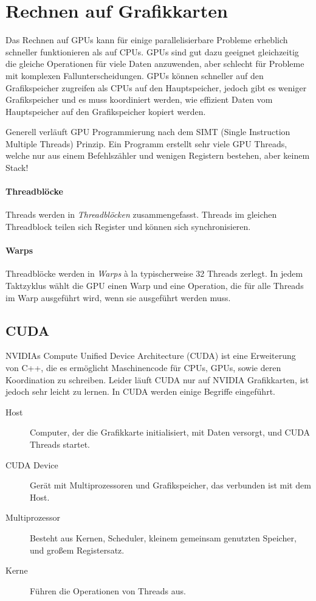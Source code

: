 \section{Rechnen auf Grafikkarten}
Das Rechnen auf GPUs kann für einige parallelisierbare Probleme erheblich schneller funktionieren als auf CPUs.
GPUs sind gut dazu geeignet gleichzeitig die gleiche Operationen für viele Daten anzuwenden, aber schlecht für Probleme mit komplexen Fallunterscheidungen.
GPUs können schneller auf den Grafikspeicher zugreifen als CPUs auf den Hauptspeicher, jedoch gibt es weniger Grafikspeicher und es muss koordiniert werden, wie effizient Daten vom Hauptspeicher auf den Grafikspeicher kopiert werden.

Generell verläuft GPU Programmierung nach dem SIMT (Single Instruction Multiple Threads) Prinzip.
Ein Programm erstellt sehr viele GPU Threads, welche nur aus einem Befehlszähler und wenigen Registern bestehen, aber keinem Stack!

\paragraph{Threadblöcke}
Threads werden in \emph{Threadblöcken} zusammengefasst.
Threads im gleichen Threadblock teilen sich Register und können sich synchronisieren.

\paragraph{Warps}
Threadblöcke werden in \emph{Warps} à la typischerweise 32 Threads zerlegt.
In jedem Taktzyklus wählt die GPU einen Warp und eine Operation, die für alle Threads im Warp ausgeführt wird, wenn sie ausgeführt werden muss.

\subsection{CUDA}
NVIDIAs Compute Unified Device Architecture (CUDA) ist eine Erweiterung von C++, die es ermöglicht Maschinencode für CPUs, GPUs, sowie deren Koordination zu schreiben.
Leider läuft CUDA nur auf NVIDIA Grafikkarten, ist jedoch sehr leicht zu lernen.
In CUDA werden einige Begriffe eingeführt.

\begin{description}
\item[Host] Computer, der die Grafikkarte initialisiert, mit Daten versorgt, und CUDA Threads startet.
\item[CUDA Device] Gerät mit Multiprozessoren und Grafikspeicher, das verbunden ist mit dem Host.
\item[Multiprozessor] Besteht aus Kernen, Scheduler, kleinem gemeinsam genutzten Speicher, und großem Registersatz.
\item[Kerne] Führen die Operationen von Threads aus.
\end{description}

